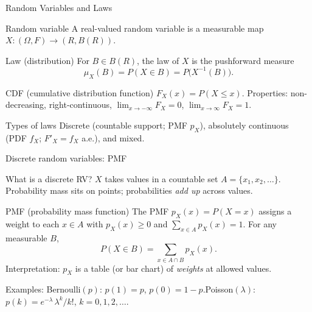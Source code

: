 \documentclass[aspectratio=43]{beamer}
\def\P{P}%
\def\mathbb#1{#1}%
\def\mathcal#1{#1}%
\newcommand{\R}{\mathbb{R}}
\renewcommand{\P}{\mathbb{P}}
\newcommand{\1}{\mathbf{1}}
\begin{document}
\begin{frame}{Random Variables and Laws}{}
  {\small
  \begin{block}{Random variable}
    A real-valued random variable is a measurable map $X:(\Omega,\mathcal{F})\to(\R,\mathcal{B}(\R))$.
  \end{block}
  \vspace{-0.4em}
  \begin{block}{Law (distribution)}
    For $B\in\mathcal{B}(\R)$, the law of $X$ is the pushforward measure
    {\scriptsize\[
      \mu_X(B)=\P(X\in B)=\P\big(X^{-1}(B)\big).
    \]}
  \end{block}
  \vspace{-0.4em}
  \begin{block}{CDF (cumulative distribution function)}
    $F_X(x)=\P(X\le x)$. Properties: non-decreasing, right-continuous, $\lim_{x\to-\infty}F_X=0$, $\lim_{x\to\infty}F_X=1$.
  \end{block}
  \vspace{-0.4em}
  \begin{block}{Types of laws}
    Discrete (countable support; PMF $p_X$), absolutely continuous (PDF $f_X$; $F'_X=f_X$ a.e.), and mixed.
  \end{block}
  }
\end{frame}

\begin{frame}{Discrete random variables: PMF}{}
  {\small
  \begin{block}{What is a discrete RV?}
    $X$ takes values in a countable set $A=\{x_1,x_2,\dots\}$. Probability mass sits on points; probabilities \emph{add up} across values.
  \end{block}
  \vspace{-0.4em}
  \begin{block}{PMF (probability mass function)}
    The PMF $p_X(x)=\P(X=x)$ assigns a weight to each $x\in A$ with $p_X(x)\ge 0$ and $\sum_{x\in A} p_X(x)=1$. For any measurable $B$,
    {\scriptsize\[
      \P(X\in B)=\sum_{x\in A\cap B} p_X(x).
    \]}
    Interpretation: $p_X$ is a table (or bar chart) of \emph{weights} at allowed values.
  \end{block}
  {\scriptsize Examples: Bernoulli$(p)$: $p(1)=p$, $p(0)=1-p$.\quad Poisson$(\lambda)$: $p(k)=e^{-\lambda}\,\lambda^k/k!$, $k=0,1,2,\dots$.}
  }
\end{frame}
\end{document}
